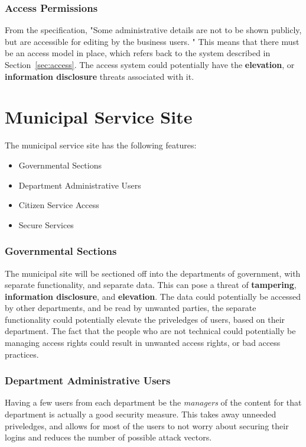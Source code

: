 \documentclass{article}
\numberwithin{equation}{section} %
\numberwithin{figure}{section} %
\numberwithin{table}{section} %
\begin{document}
\subsubsection{Access Permissions}
From the specification, "Some administrative details are not to be shown publicly, but are accessible for editing by the business users. "\cite{spec}  This means that there must be an access model in place, which refers back to the system described in Section~\ref{sec:access}.  The access system could potentially have the \textbf{elevation}, or \textbf{information disclosure} threats associated with it.

\section{Municipal Service Site}
\label{sec:municipal}
The municipal service site has the following features: 
\begin{itemize}
	\item Governmental Sections
	\item Department Administrative Users
	\item Citizen Service Access
	\item Secure Services
\end{itemize}

\subsubsection{Governmental Sections}
The municipal site will be sectioned off into the departments of government, with separate functionality, and separate data.  This can pose a threat of \textbf{tampering}, \textbf{information disclosure}, and \textbf{elevation}.  The data could potentially be accessed by other departments, and be read by unwanted parties, the separate functionality could potentially elevate the priveledges of users, based on their department.  The fact that the people who are not technical could potentially be managing access rights could result in unwanted access rights, or bad access practices. 

\subsubsection{Department Administrative Users}
Having a few users from each department be the \textit{managers} of the content for that department is actually a good security measure.  This takes away unneeded priveledges, and allows for most of the users to not worry about securing their logins and reduces the number of possible attack vectors. 
\end{document}
